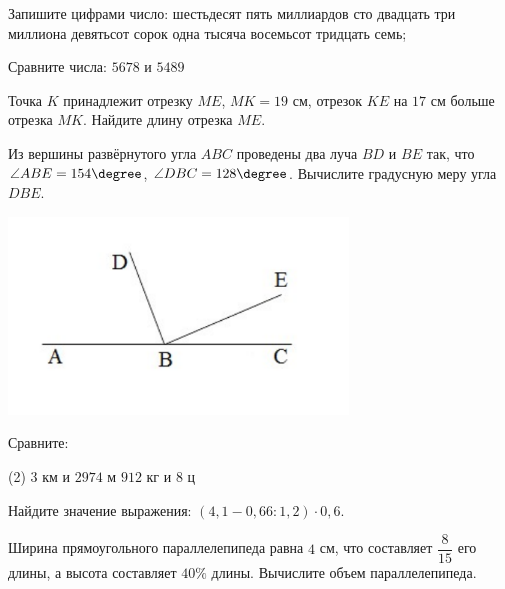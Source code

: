 \begin{class}[number=3]
	\begin{listofex}
		\item Запишите цифрами число: шестьдесят пять миллиардов сто двадцать три миллиона девятьсот сорок одна тысяча восемьсот тридцать семь;
		\item Сравните числа: \( 5 678  \) и \( 5 489 \)
		\item Точка \( K \) принадлежит отрезку \( ME \), \( MK = 19 \) см, отрезок \( KE \) на \( 17 \) см больше отрезка \( MK \). Найдите длину отрезка \( ME \).
		\item
		\begin{minipage}[t]{\bodywidth}
			Из вершины развёрнутого угла \( ABC \) проведены два луча \( BD \) и \( BE \) так,
		что \( \angle ABE = 154\degree \), \( \angle DBC = 128\degree \). Вычислите градусную меру угла \( DBE \).
		\end{minipage}
		\hspace{0.02\linewidth}
		\begin{minipage}[t]{\picwidth}
			\includegraphics[align=t, width=\linewidth]{../../../../exercises/lists/pics/arofikinM9L3-1}
		\end{minipage}
		\item Сравните: \begin{tasks}(2)
			\task \( 3 \) км и \( 2 974 \) м
			\task \( 912 \) кг и \( 8 \) ц
		\end{tasks}
		\item Найдите значение выражения: \( (4,1 - 0,66 : 1,2) \cdot0,6 \).
		\item Ширина прямоугольного параллелепипеда равна \( 4 \) см, что составляет \( \dfrac{8}{15} \) его длины, а высота составляет \( 40\% \) длины. Вычислите объем параллелепипеда.

\end{listofex}
\end{class}
